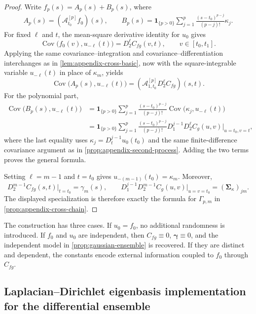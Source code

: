 \documentclass[11pt,a4paper]{article}
\theoremstyle{definition}
\theoremstyle{remark}
\DeclareMathOperator{\Cov}{Cov}
\begin{document}
\begin{proof}
Write \(f_p(s)=A_p(s)+B_p(s)\), where
\begin{align*}
A_p(s)=(\mathcal A_{t_0}^{[p]}f_0)(s),
\qquad
B_p(s)=\mathbf{1}_{\{p>0\}}\sum_{j=1}^{p}\frac{(s-t_0)^{p-j}}{(p-j)!}\kappa_j.
\end{align*}
For fixed \(\ell\) and \(t\), the mean-square derivative identity for \(u_0\) gives
\[
\Cov\bigl(f_0(v),u_{-\ell}(t)\bigr)=D_2^\ell C_{fg}(v,t),
\qquad v\in[t_0,t_1].
\]
Applying the same covariance--integration and covariance--differentiation interchanges as in \cref{lem:appendix-cross-basic}, now with the square-integrable variable \(u_{-\ell}(t)\) in place of \(\kappa_m\), yields
\[
\Cov\bigl(A_p(s),u_{-\ell}(t)\bigr)
=(\mathcal A_{1,t_0}^{[p]}D_2^\ell C_{fg})(s,t).
\]
For the polynomial part,
\begin{align*}
\Cov\bigl(B_p(s),u_{-\ell}(t)\bigr)
&=\mathbf{1}_{\{p>0\}}\sum_{j=1}^{p}\frac{(s-t_0)^{p-j}}{(p-j)!}\Cov\bigl(\kappa_j,u_{-\ell}(t)\bigr)\\
&=\mathbf{1}_{\{p>0\}}\sum_{j=1}^{p}\frac{(s-t_0)^{p-j}}{(p-j)!}D_1^{j-1}D_2^\ell C_g(u,v)\big|_{u=t_0,v=t},
\end{align*}
where the last equality uses \(\kappa_j=D_t^{j-1}u_0(t_0)\) and the same finite-difference covariance argument as in \cref{prop:appendix-second-process}. Adding the two terms proves the general formula.

Setting \(\ell=m-1\) and \(t=t_0\) gives \(u_{-(m-1)}(t_0)=\kappa_m\). Moreover,
\[
D_2^{m-1}C_{fg}(s,t)\big|_{t=t_0}=\gamma_m(s),
\qquad
D_1^{j-1}D_2^{m-1}C_g(u,v)\big|_{u=v=t_0}=(\boldsymbol{\Sigma}_{\kappa})_{jm}.
\]
The displayed specialization is therefore exactly the formula for \(\Gamma_{p,m}\) in \cref{prop:appendix-cross-chain}.
\end{proof}


The construction has three cases. If \(u_0=f_0\), no additional randomness is introduced. If \(f_0\) and \(u_0\) are independent, then \(C_{fg}\equiv0\), \(\boldsymbol{\gamma}\equiv0\), and the independent model in \cref{prop:gaussian-ensemble} is recovered. If they are distinct and dependent, the constants encode external information coupled to \(f_0\) through \(C_{fg}\).





\subsection{Laplacian--Dirichlet eigenbasis implementation for the differential ensemble}\label{appendix:marginal-finite-basis-likelihood}
\end{document}
